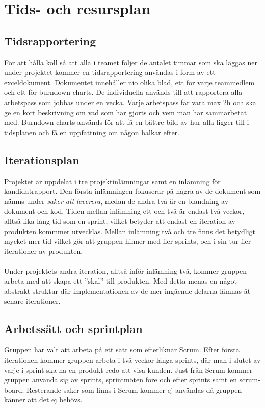 \section{Tids- och resursplan}

\subsection{Tidsrapportering}
För att hålla koll så att alla i teamet följer de antalet timmar som ska läggas ner under
projektet kommer en tidsrapportering\cite{bib-tidsrapportering} användas i form av ett 
exceldokument. Dokumentet innehåller nio olika blad, ett för varje teammedlem och ett för 
burndown charts. De individuella används till att rapportera alla arbetspass som jobbas under 
en vecka. Varje arbetspass får vara max 2h och ska ge en kort beskrivning om vad som har gjorts 
och vem man har sammarbetat med. Burndown charts används för att få en bättre bild av hur alla
ligger till i tidsplanen och få en uppfattning om någon halkar efter.


\subsection{Iterationsplan}
Projektet är uppdelat i tre projektinlämningar samt en inlämning för kandidatrapport. Den första inlämningen fokuserar
på några av de dokument som nämns under \textit{saker att leverera}, medan de andra två är en blandning av dokument och kod. Tiden mellan inlämning ett och två är endast två veckor, alltså lika lång tid som en sprint, vilket betyder att endast en iteration av produkten kommmer utvecklas. Mellan inlämning två och tre finns det betydligt mycket mer tid vilket gör att gruppen hinner med fler sprints, och i sin tur fler iterationer av produkten.\\
\\
Under projektets andra iteration, alltså inför inlämning två, kommer gruppen arbeta med att skapa ett ''skal'' till produkten. Med detta menas en något abstrakt struktur där implementationen av de mer ingående delarna lämnas åt senare iterationer.

\subsection{Arbetssätt och sprintplan}
Gruppen har valt att arbeta på ett sätt som efterliknar Scrum. Efter första iterationen kommer gruppen arbeta i två veckor långa sprints, där man i slutet av varje i sprint ska ha en produkt redo att visa kunden. Just från Scrum kommer gruppen använda sig av sprints, sprintmöten före och efter sprints samt en scrum-board. Resterande saker som finns i Scrum kommer ej användas då gruppen känner att det ej behövs.

